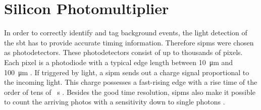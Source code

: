 \section{Silicon Photomultiplier}
In order to correctly identify and tag background events, the light detection of the \ac{sbt} has to provide accurate timing information.
Therefore \acp{sipm} were chosen as photodetectors.
These photodetectors consist of up to thousands of pixels.
Each pixel is a photodiode with a typical edge length between \SI{10}{\micro\meter} and \SI{100}{\micro\meter} \cite{nucl}.
If triggered by light, a \ac{sipm} sends out a charge signal proportional to the incoming light.
This charge possesses a fast-rising edge with a rise time of the order of tens of \si{\piko\second} \cite{nucl}.
Besides the good time resolution, \acp{sipm} also make it possible to count the arriving photos with a sensitivity down to single photons \cite{HAMA_mppc}.


